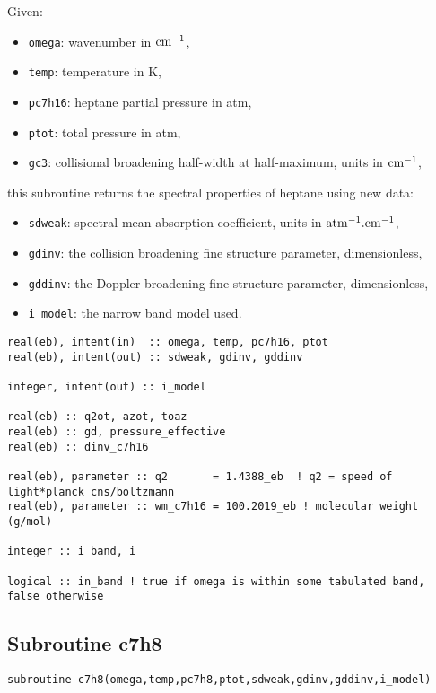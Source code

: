 Given:
\begin{itemize}
 \item \verb=omega=: wavenumber in $\rm cm^{-1}$,
 \item \verb=temp=: temperature in K,
 \item \verb=pc7h16=: heptane partial pressure in atm,
 \item \verb=ptot=: total pressure in atm,
 \item \verb=gc3=: collisional broadening half-width at half-maximum, units in $\rm cm^{-1}$,
\end{itemize}
this subroutine returns the spectral properties of heptane using new data:
\begin{itemize}
 \item \verb=sdweak=: spectral mean absorption coefficient, units in $\rm atm^{-1}.cm^{-1}$,
 \item \verb=gdinv=: the collision broadening fine structure parameter, dimensionless,
 \item \verb=gddinv=: the Doppler broadening fine structure parameter, dimensionless,
 \item \verb=i_model=: the narrow band model used.
\end{itemize}

\begin{lstlisting}
real(eb), intent(in)  :: omega, temp, pc7h16, ptot
real(eb), intent(out) :: sdweak, gdinv, gddinv

integer, intent(out) :: i_model

real(eb) :: q2ot, azot, toaz
real(eb) :: gd, pressure_effective
real(eb) :: dinv_c7h16

real(eb), parameter :: q2       = 1.4388_eb  ! q2 = speed of light*planck cns/boltzmann
real(eb), parameter :: wm_c7h16 = 100.2019_eb ! molecular weight (g/mol)

integer :: i_band, i

logical :: in_band ! true if omega is within some tabulated band, false otherwise

\end{lstlisting}


\subsection{Subroutine c7h8}
\label{sub:c7h8}
\begin{lstlisting}
subroutine c7h8(omega,temp,pc7h8,ptot,sdweak,gdinv,gddinv,i_model)
\end{lstlisting}

